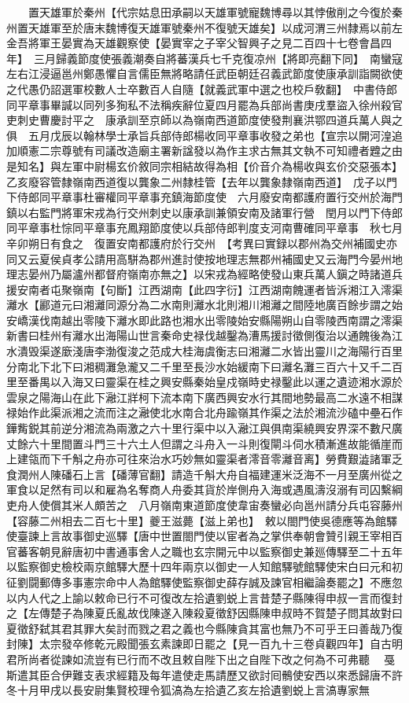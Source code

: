 　　置天雄軍於秦州【代宗姑息田承嗣以天雄軍號寵魏博尋以其悖傲削之今復於秦州置天雄軍至於唐末魏博復天雄軍號秦州不復號天雄矣】以成河渭三州隸焉以前左金吾將軍王晏實為天雄觀察使【晏實宰之子宰父智興子之見二百四十七卷會昌四年】　三月歸義節度使張義潮奏自將蕃漢兵七千克復凉州【將即亮翻下同】　南蠻寇左右江浸逼邕州鄭愚懼自言儒臣無將略請任武臣朝廷召義武節度使康承訓詣闕欲使之代愚仍詔選軍校數人士卒數百人自隨【就義武軍中選之也校戶敎翻】　中書侍郎同平章事畢諴以同列多狥私不法稱疾辭位夏四月罷為兵部尚書庚戌羣盜入徐州殺官吏刺史曹慶討平之　康承訓至京師以為嶺南西道節度使發荆襄洪鄂四道兵萬人與之俱　五月戊辰以翰林學士承旨兵部侍郎楊收同平章事收發之弟也【宣宗以開河湟追加順憲二宗尊號有司議改造廟主署新諡發以為作主求古無其文執不可知禮者韙之由是知名】與左軍中尉楊玄价敘同宗相結故得為相【价音介為楊收與玄价交惡張本】　乙亥廢容管隸嶺南西道復以龔象二州隸桂管【去年以龔象隸嶺南西道】　戊子以門下侍郎同平章事杜審權同平章事充鎮海節度使　六月廢安南都護府置行交州於海門鎮以右監門將軍宋戎為行交州刺史以康承訓兼領安南及諸軍行營　閏月以門下侍郎同平章事杜悰同平章事充鳳翔節度使以兵部侍郎判度支河南曹確同平章事　秋七月辛卯朔日有食之　復置安南都護府於行交州　【考異曰實録以郡州為交州補國史亦同又云夏侯貞孝公請用高駢為郡州進討使按地理志無郡州補國史又云海門今晏州地理志晏州乃屬瀘州都督府嶺南亦無之】以宋戎為經略使發山東兵萬人鎭之時諸道兵援安南者屯聚嶺南【句斷】江西湖南【此四字衍】江西湖南餽運者皆泝湘江入澪渠灕水【酈道元曰湘灕同源分為二水南則灕水北則湘川湘灕之間陸地廣百餘步謂之始安嶠漢伐南越出零陵下灕水即此路也湘水出零陵始安縣陽朔山自零陵西南謂之澪渠新書曰桂州有灕水出海陽山世言秦命史禄伐越鑿為漕馬援討徵側復治以通餽後為江水潰毁渠遂廞淺唐李渤復浚之范成大桂海虞衡志曰湘灕二水皆出靈川之海陽行百里分南北下北下曰湘稠灘急瀧又二千里至長沙水始緩南下曰灕名灘三百六十又千二百里至番禺以入海又曰靈渠在桂之興安縣秦始皇戍嶺時史禄鑿此以運之遺迹湘水源於雲泉之陽海山在此下瀜江牂柯下流本南下廣西興安水行其間地勢最高二水遠不相謀禄始作此渠派湘之流而注之瀜使北水南合北舟踰嶺其作渠之法於湘流沙磕中壘石作鏵觜鋭其前逆分湘流為兩激之六十里行渠中以入瀜江與俱南渠繞興安界深不數尺廣丈餘六十里間置斗門三十六土人但謂之斗舟入一斗則復閘斗伺水積漸進故能循崖而上建瓴而下千斛之舟亦可往來治水巧妙無如靈渠者澪音零灕音离】勞費艱澁諸軍乏食潤州人陳磻石上言【磻薄官翻】請造千斛大舟自福建運米泛海不一月至廣州從之軍食以足然有司以和雇為名奪商人舟委其貨於岸側舟入海或遇風濤沒溺有司囚繫綱吏舟人使償其米人頗苦之　八月嶺南東道節度使韋宙奏蠻必向邕州請分兵屯容藤州【容藤二州相去二百七十里】夔王滋薨【滋上弟也】　敕以閤門使吳德應等為館驛使臺諫上言故事御史巡驛【唐中世置閤門使以宦者為之掌供奉朝會贊引親王宰相百官蕃客朝見辭唐初中書通事舍人之職也玄宗開元中以監察御史兼廵傳驛至二十五年以監察御史檢校兩京館驛大歷十四年兩京以御史一人知館驛號館驛使宋白曰元和初征劉闘郵傳多事憲宗命中人為館驛使監察御史薛存誠及諫官相繼論奏罷之】不應忽以内人代之上諭以敕命已行不可復改左拾遺劉蜕上言昔楚子縣陳得申叔一言而復封之【左傳楚子為陳夏氏亂故伐陳遂入陳殺夏徵舒因縣陳申叔時不賀楚子問其故對曰夏徵舒弑其君其罪大矣討而戮之君之義也今縣陳貪其富也無乃不可乎王曰善哉乃復封陳】太宗發卒修乾元殿聞張玄素諫即日罷之【見一百九十三卷貞觀四年】自古明君所尚者從諫如流豈有已行而不改且敕自陛下出之自陛下改之何為不可弗聽　戞斯遣其臣合伊難支表求經籍及每年遣使走馬請歷又欲討囘鶻使安西以來悉歸唐不許　冬十月甲戌以長安尉集賢校理令狐滈為左拾遺乙亥左拾遺劉蜕上言滈專家無